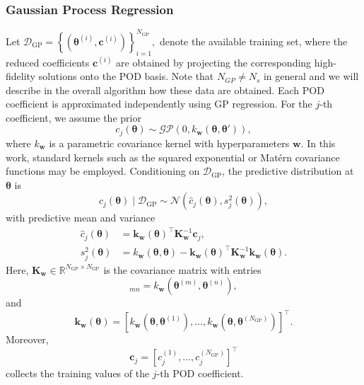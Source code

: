 \documentclass{elsarticle}
\begin{document}
\subsubsection{Gaussian Process Regression}
Let $
\mathcal D_{\mathrm{GP}}
=
\left\{
\left(
\boldsymbol{\theta}^{(i)},
\mathbf c^{(i)}
\right)
\right\}_{i=1}^{N_{\mathrm{GP}}},
$
denote the available training set, where the reduced coefficients
\(\mathbf c^{(i)}\) are obtained by projecting the corresponding
high-fidelity solutions onto the POD basis. Note that $N_{GP} \neq N_s$ in general and we will describe in the overall algorithm how these data are obtained.
Each POD coefficient is approximated independently using GP 
regression. For the \(j\)-th coefficient, we assume the prior
\begin{equation}
c_j(\boldsymbol{\theta})
\sim
\mathcal{GP}
\left(
0,
k_{\mathbf w}
(\boldsymbol{\theta},\boldsymbol{\theta}')
\right),
\end{equation}
where \(k_{\mathbf w}\) is a parametric covariance kernel with
hyperparameters \(\mathbf w\). In this work, standard kernels such as the
squared exponential or Matérn covariance functions may be employed.
Conditioning on \(\mathcal D_{\mathrm{GP}}\), the predictive distribution at
\(\boldsymbol{\theta}\) is
\begin{equation}
c_j(\boldsymbol{\theta})
\mid
\mathcal D_{\mathrm{GP}}
\sim
\mathcal N
\left(
\widehat c_j(\boldsymbol{\theta}),
s_j^2(\boldsymbol{\theta})
\right),
\end{equation}
with predictive mean and variance
\begin{align}
\widehat c_j(\boldsymbol{\theta})
&=
\mathbf k_{\mathbf w}(\boldsymbol{\theta})^\top
\mathbf K_{\mathbf w}^{-1}
\mathbf c_j,
\\
s_j^2(\boldsymbol{\theta})
&=
k_{\mathbf w}(\boldsymbol{\theta},\boldsymbol{\theta})
-
\mathbf k_{\mathbf w}(\boldsymbol{\theta})^\top
\mathbf K_{\mathbf w}^{-1}
\mathbf k_{\mathbf w}(\boldsymbol{\theta}).
\end{align}
Here,
\(\mathbf K_{\mathbf w}\in
\mathbb R^{N_{\mathrm{GP}}\times N_{\mathrm{GP}}}\) is the covariance matrix
with entries
\begin{equation}
[\mathbf K_{\mathbf w}]_{mn}
=
k_{\mathbf w}
\left(
\boldsymbol{\theta}^{(m)},
\boldsymbol{\theta}^{(n)}
\right),
\end{equation}
and
\begin{equation}
\mathbf k_{\mathbf w}(\boldsymbol{\theta})
=
\left[
k_{\mathbf w}(\boldsymbol{\theta},\boldsymbol{\theta}^{(1)}),
\ldots,
k_{\mathbf w}(\boldsymbol{\theta},\boldsymbol{\theta}^{(N_{\mathrm{GP}})})
\right]^\top.
\end{equation}
Moreover,
\begin{equation}
\mathbf c_j
=
\left[
c_j^{(1)},
\ldots,
c_j^{(N_{\mathrm{GP}})}
\right]^\top
\end{equation}
collects the training values of the \(j\)-th POD coefficient.
\end{document}

